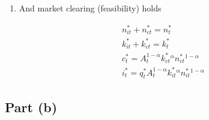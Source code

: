 \documentclass{scrartcl}
\begin{document}
\begin{itemize}
\begin{enumerate}
		\item And market clearing (feasibility) holds
		
		\begin{align}
		n^*_{it}+n^*_{ct}=n^*_{t} \label{eq:nclearing} \\
		k^*_{it}+k^*_{ct}=k^*_{t} \label{eq:kclearing} \\
		c^*_t=A_t^{1-\alpha}k^*_{ct}^\alpha n^*_{ct}^{1-\alpha} \\
		i^*_t=q^*_t A_t^{1-\alpha}k^*_{it}^\alpha n^*_{it}^{1-\alpha}
		\end{align}
		
	\end{enumerate}
	
\end{itemize}

\subsection*{Part (b)}
\end{document}
